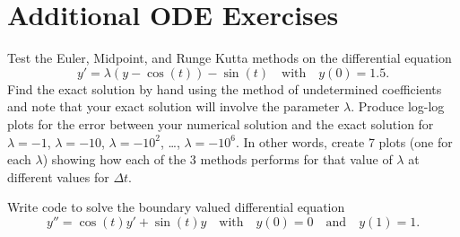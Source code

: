 \section{Additional ODE Exercises}
\begin{problem}
    Test the Euler, Midpoint, and Runge Kutta methods on the differential
    equation
    \[ y' = \lambda \left( y - \cos(t) \right) - \sin(t) \quad \text{with} \quad y(0) = 1.5. \]
    Find the exact solution by hand using the method of undetermined coefficients and note
    that your exact solution will involve the parameter $\lambda$.  Produce log-log plots
    for the error between your numerical solution and the exact solution for $\lambda =
    -1$, $\lambda = -10$, $\lambda = -10^2$, \ldots, $\lambda = -10^6$.  In other words,
    create 7 plots (one for each $\lambda$) showing how each of the 3 methods performs for
    that value of $\lambda$ at different values for $\Delta t$.
\end{problem}

\begin{problem}
    Write code to solve the boundary valued differential equation
    \[ y'' = \cos(t) y' + \sin(t) y \quad \text{with} \quad y(0) = 0 \quad \text{and}
        \quad y(1) = 1. \]
\end{problem}


